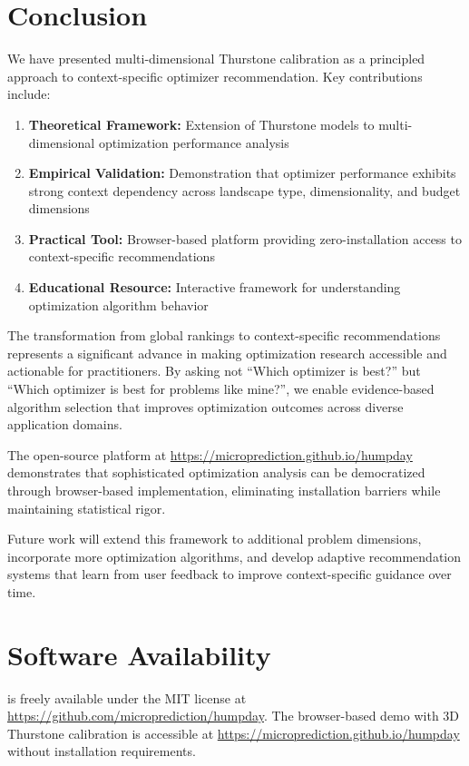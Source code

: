 \documentclass[article]{jss}
\begin{document}
\section{Conclusion} \label{sec:conclusion}

We have presented multi-dimensional Thurstone calibration as a principled approach to context-specific optimizer recommendation. Key contributions include:

\begin{enumerate}
\item \textbf{Theoretical Framework:} Extension of Thurstone models to multi-dimensional optimization performance analysis
\item \textbf{Empirical Validation:} Demonstration that optimizer performance exhibits strong context dependency across landscape type, dimensionality, and budget dimensions
\item \textbf{Practical Tool:} Browser-based platform providing zero-installation access to context-specific recommendations
\item \textbf{Educational Resource:} Interactive framework for understanding optimization algorithm behavior
\end{enumerate}

The transformation from global rankings to context-specific recommendations represents a significant advance in making optimization research accessible and actionable for practitioners. By asking not ``Which optimizer is best?'' but ``Which optimizer is best for problems like mine?'', we enable evidence-based algorithm selection that improves optimization outcomes across diverse application domains.

The open-source platform at \url{https://microprediction.github.io/humpday} demonstrates that sophisticated optimization analysis can be democratized through browser-based implementation, eliminating installation barriers while maintaining statistical rigor.

Future work will extend this framework to additional problem dimensions, incorporate more optimization algorithms, and develop adaptive recommendation systems that learn from user feedback to improve context-specific guidance over time.

\section*{Software Availability}

 is freely available under the MIT license at \url{https://github.com/microprediction/humpday}. The browser-based demo with 3D Thurstone calibration is accessible at \url{https://microprediction.github.io/humpday} without installation requirements.
\end{document}
